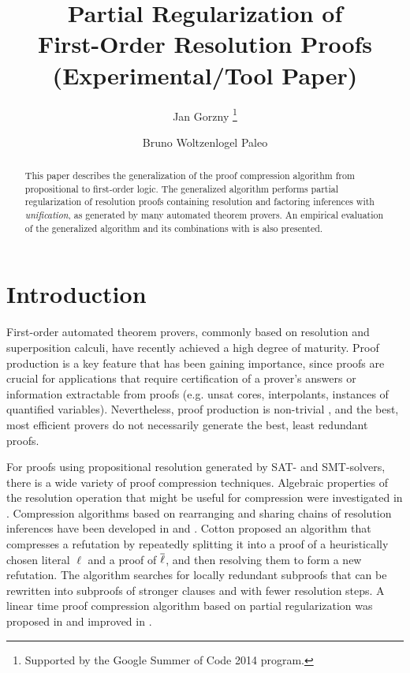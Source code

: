\documentclass{llncs}
\title{Partial Regularization of\\ First-Order Resolution Proofs\\
(Experimental/Tool Paper)}
\author{
  Jan Gorzny\inst{1}
  \thanks{Supported by the Google Summer of Code 2014 program.}
  \and 
  Bruno Woltzenlogel Paleo\inst{2,3}
}
\institute{
  \email{jgorzny@uvic.ca}, University of Victoria, Canada
  \and 
  \email{bruno@logic.at}, Vienna University of Technology, Austria
  \and 
  Australian National University
}
\begin{document}
\maketitle


\begin{abstract}
This paper describes the generalization of the 
proof compression algorithm
\RecyclePivotsIntersection 
from propositional to first-order logic. The generalized algorithm performs partial regularization of resolution proofs containing resolution and factoring inferences with \emph{unification}, as generated by many automated theorem provers. An empirical evaluation of the generalized algorithm and its combinations with \SFOLowerUnits is also presented.
\end{abstract}


\setcounter{footnote}{0}

\section{Introduction} 

First-order automated theorem provers, commonly based on resolution and superposition calculi, have recently achieved a high degree of maturity. Proof production is a key feature that has been gaining importance, since proofs are crucial for applications that require certification of a prover's answers or information extractable from proofs (e.g. unsat cores, interpolants, instances of quantified variables). Nevertheless, proof production is non-trivial \cite{SchulzAPPA}, and the best, most efficient provers do not necessarily generate the best, least redundant proofs.

For proofs using propositional resolution generated by SAT- and SMT-solvers, there is a wide variety of proof compression techniques. Algebraic properties of the resolution operation that might be useful for compression were investigated in \cite{bwp10}.
Compression algorithms based on rearranging and sharing chains of resolution inferences have been
developed in \cite{Amjad07} and \cite{Sinz}.  Cotton \cite{CottonSplit} proposed an algorithm that
compresses a refutation by repeatedly splitting it into a proof of a heuristically chosen literal $\ell$
and a proof of $\overline{\ell}$, and then resolving them to form a new refutation.  The {\ReduceReconstruct} algorithm \cite{RedRec} searches for locally redundant
subproofs that can be rewritten into subproofs of stronger clauses and with fewer resolution steps.
A linear time proof compression algorithm based on partial
regularization was proposed in \cite{RP08} and improved in \cite{LURPI}.
\end{document}
